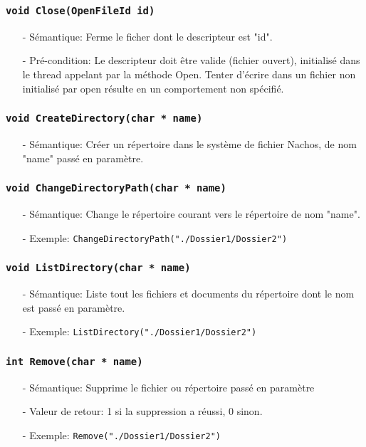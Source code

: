 \documentclass[11pt]{article}
\theoremstyle{definition}
\begin{document}
\subsubsection{\texttt{void Close(OpenFileId id)}}
\begin{itemize}
\item[-]Sémantique: Ferme le ficher dont le descripteur est "id".
\item[-]Pré-condition: Le descripteur doit être valide (fichier ouvert), initialisé dans le thread appelant
  par la méthode Open. Tenter d'écrire dans un fichier non initialisé par open résulte en un comportement non spécifié.
\end{itemize}

\subsubsection{\texttt{void CreateDirectory(char * name)}}
\begin{itemize}
\item[-]Sémantique: Créer un répertoire dans le système de fichier Nachos, de nom "name"
  passé en paramètre.
\end{itemize}

\subsubsection{\texttt{void ChangeDirectoryPath(char * name)}}
\begin{itemize}
\item[-]Sémantique: Change le répertoire courant vers le répertoire de nom "name".
\item[-]Exemple: \texttt{ChangeDirectoryPath("./Dossier1/Dossier2")}
\end{itemize}

\subsubsection{\texttt{void ListDirectory(char * name)}}
\begin{itemize}
\item[-]Sémantique: Liste tout les fichiers et documents du répertoire dont le nom est passé en paramètre.
\item[-]Exemple: \texttt{ListDirectory("./Dossier1/Dossier2")}
\end{itemize}

 \subsubsection{\texttt{int Remove(char * name)}}
\begin{itemize}
\item[-]Sémantique: Supprime le fichier ou répertoire passé en paramètre
\item[-]Valeur de retour: 1 si la suppression a réussi, 0 sinon.
\item[-]Exemple: \texttt{Remove("./Dossier1/Dossier2")}
\end{itemize}
\end{document}
